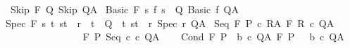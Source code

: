 \begin{isabellebody}
\isanewline
\ \ Skip{\isacharcolon}\ {\isachardoublequoteopen}{\isasymGamma}{\isacharcomma}{\isasymTheta}{\isasymturnstile}\isactrlbsub {\isacharslash}F\isactrlesub \ Q\ Skip\ Q{\isacharcomma}A{\isachardoublequoteclose}\isanewline
\isanewline
{\isacharbar}\ Basic{\isacharcolon}\ {\isachardoublequoteopen}{\isasymGamma}{\isacharcomma}{\isasymTheta}{\isasymturnstile}\isactrlbsub {\isacharslash}F\isactrlesub \ {\isacharbraceleft}s{\isachardot}\ f\ s\ {\isasymin}\ Q{\isacharbraceright}\ {\isacharparenleft}Basic\ f{\isacharparenright}\ Q{\isacharcomma}A{\isachardoublequoteclose}\isanewline
\isanewline
{\isacharbar}\ Spec{\isacharcolon}\ {\isachardoublequoteopen}{\isasymGamma}{\isacharcomma}{\isasymTheta}{\isasymturnstile}\isactrlbsub {\isacharslash}F\isactrlesub \ {\isacharbraceleft}s{\isachardot}\ {\isacharparenleft}{\isasymforall}t{\isachardot}\ {\isacharparenleft}s{\isacharcomma}t{\isacharparenright}\ {\isasymin}\ r\ {\isasymlongrightarrow}\ t\ {\isasymin}\ Q{\isacharparenright}\ {\isasymand}\ {\isacharparenleft}{\isasymexists}t{\isachardot}\ {\isacharparenleft}s{\isacharcomma}t{\isacharparenright}\ {\isasymin}\ r{\isacharparenright}{\isacharbraceright}\ {\isacharparenleft}Spec\ r{\isacharparenright}\ Q{\isacharcomma}A{\isachardoublequoteclose}\isanewline
\isanewline
{\isacharbar}\ Seq{\isacharcolon}\ {\isachardoublequoteopen}{\isasymlbrakk}{\isasymGamma}{\isacharcomma}{\isasymTheta}{\isasymturnstile}\isactrlbsub {\isacharslash}F\isactrlesub \ P\ c\ R{\isacharcomma}A{\isacharsemicolon}\ {\isasymGamma}{\isacharcomma}{\isasymTheta}{\isasymturnstile}\isactrlbsub {\isacharslash}F\isactrlesub \ R\ c\ Q{\isacharcomma}A{\isasymrbrakk}\isanewline
\ \ \ \ \ \ \ \ {\isasymLongrightarrow}\isanewline
\ \ \ \ \ \ \ \ {\isasymGamma}{\isacharcomma}{\isasymTheta}{\isasymturnstile}\isactrlbsub {\isacharslash}F\isactrlesub \ P\ {\isacharparenleft}Seq\ c\ c\ Q{\isacharcomma}A{\isachardoublequoteclose}\isanewline
\ \ \isanewline
{\isacharbar}\ Cond{\isacharcolon}\ {\isachardoublequoteopen}{\isasymlbrakk}{\isasymGamma}{\isacharcomma}{\isasymTheta}{\isasymturnstile}\isactrlbsub {\isacharslash}F\isactrlesub \ {\isacharparenleft}P\ {\isasyminter}\ b{\isacharparenright}\ c\ Q{\isacharcomma}A{\isacharsemicolon}\ {\isasymGamma}{\isacharcomma}{\isasymTheta}{\isasymturnstile}\isactrlbsub {\isacharslash}F\isactrlesub \ {\isacharparenleft}P\ {\isasyminter}\ {\isacharminus}\ b{\isacharparenright}\ c\ Q{\isacharcomma}A{\isasymrbrakk}\isanewline

\end{isabellebody}

